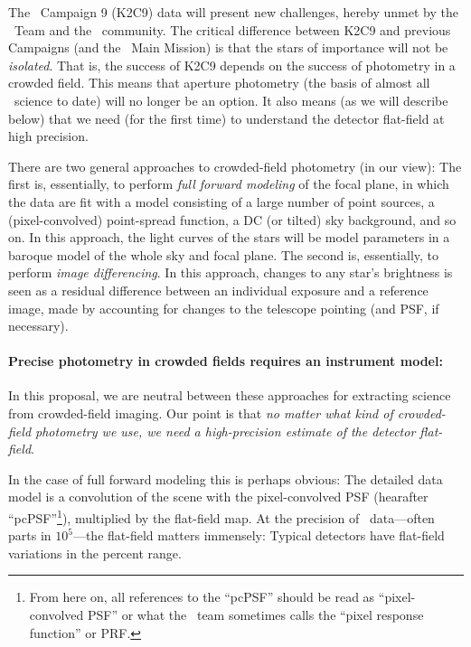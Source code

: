 \documentclass[12pt,preprint]{aastex}
\begin{document}
The \ktwo\ Campaign 9 (K2C9) data will present new challenges, hereby
unmet by the \ktwo\ Team and the \kepler\ community.
The critical difference between K2C9 and previous Campaigns (and the
\kepler\ Main Mission) is that the stars of importance will not be
\emph{isolated}.
That is, the success of K2C9 depends on the success of photometry in a
crowded field.
This means that aperture photometry (the basis of almost all
\kepler\ science to date) will no longer be an option.
It also means (as we will describe below) that we need (for the first
time) to understand the detector flat-field at high precision.

There are two general approaches to crowded-field photometry (in our view):
The first is, essentially, to perform \emph{full forward modeling} of the
focal plane, in which the data are fit with a model consisting of a
large number of point sources, a (pixel-convolved) point-spread
function, a DC (or tilted) sky background, and so on.
In this approach, the light curves of the stars will be model parameters
in a baroque model of the whole sky and focal plane.
The second is, essentially, to perform \emph{image differencing}.
In this approach, changes to any star's brightness is seen as a
residual difference between an individual exposure and a reference
image, made by accounting for changes to the telescope pointing (and
PSF, if necessary).

\paragraph{Precise photometry in crowded fields requires an instrument model:}

In this proposal, we are neutral between these approaches for extracting
science from crowded-field imaging.
Our point is that \emph{no matter what kind of crowded-field photometry
we use, we need a high-precision estimate of the detector flat-field}.

In the case of full forward modeling this is perhaps obvious:
The detailed data model is a convolution of the scene with the
pixel-convolved PSF (hearafter ``pcPSF''\footnote{From here on, all references to the
  ``pcPSF'' should be read as ``pixel-convolved PSF'' or what the
  \kepler\ team sometimes calls the ``pixel response function'' or
  PRF.}), multiplied by the flat-field map.
At the precision of \kepler\ data---often parts in $10^5$---the
flat-field matters immensely:
Typical detectors have flat-field variations in the percent range.
\end{document}
